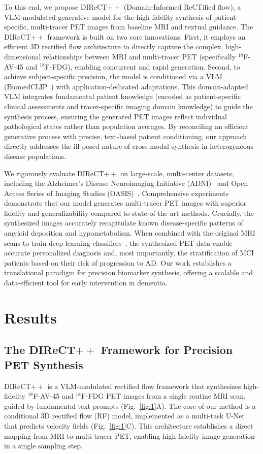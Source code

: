 \documentclass{article}
\begin{document}
To this end, we propose DIReCT$++$ (Domain-Informed ReCTified flow), a VLM-modulated generative model for the high-fidelity synthesis of patient-specific, multi-tracer PET images from baseline MRI and textual guidance. The DIReCT$++$ framework is built on two core innovations. First, it employs an efficient 3D rectified flow architecture to directly capture the complex, high-dimensional relationships between MRI and multi-tracer PET (specifically $^{18}$F-AV-45 and $^{18}$F-FDG), enabling concurrent and rapid generation. Second, to achieve subject-specific precision, the model is conditioned via a VLM (BiomedCLIP~\cite{zhang2025multimodal}) with application-dedicated adaptations. This domain-adapted VLM integrates fundamental patient knowledge (encoded as patient-specific clinical assessments and tracer-specific imaging domain knowledge) to guide the synthesis process, ensuring the generated PET images reflect individual pathological states rather than population averages. By reconciling an efficient generative process with precise, text-based patient conditioning, our approach directly addresses the ill-posed nature of cross-modal synthesis in heterogeneous disease populations.

We rigorously evaluate DIReCT$++$ on large-scale, multi-center datasets, including the Alzheimer's Disease Neuroimaging Initiative (ADNI)~\cite{weiner2010alzheimer} and Open Access Series of Imaging Studies (OASIS)~\cite{lamontagne2019oasis}. Comprehensive experiments demonstrate that our model generates multi-tracer PET images with superior fidelity and generalizability compared to state-of-the-art methods. Crucially, the synthesized images accurately recapitulate known disease-specific patterns of amyloid deposition and hypometabolism. When combined with the original MRI scans to train deep learning classifiers~\cite{lian2018hierarchical,huang2017densely}, the synthesized PET data enable accurate personalized diagnosis and, most importantly, the stratification of MCI patients based on their risk of progression to AD. Our work establishes a translational paradigm for precision biomarker synthesis, offering a scalable and data-efficient tool for early intervention in dementia.


\section{Results}
\subsection{The \texorpdfstring{DIReCT$++$}{DIReCT++} Framework for Precision PET Synthesis}
DIReCT$++$ is a VLM-modulated rectified flow framework that synthesizes high-fidelity $^{18}$F-AV-45 and $^{18}$F-FDG PET images from a single routine MRI scan, guided by fundamental text prompts (Fig.~\ref{fig:1}A). The core of our method is a conditional 3D rectified flow (RF) model, implemented as a multi-task U-Net that predicts velocity fields (Fig.~\ref{fig:1}C). This architecture establishes a direct mapping from MRI to multi-tracer PET, enabling high-fidelity image generation in a single sampling step.
\end{document}
